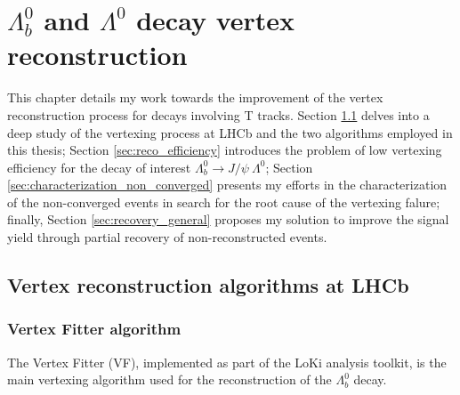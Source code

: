 \chapter{\texorpdfstring{$\Lambda_b^0$}{Lambdab} and \texorpdfstring{$\Lambda^0$}{Lambda} decay vertex reconstruction}
\label{cap:vertex_reconstruction}
This chapter details my work towards the improvement of the vertex reconstruction process for decays involving T tracks.
Section \ref{sec:reco_algorithms} delves into a deep study of the vertexing process at LHCb and the two algorithms employed in this thesis;
Section \ref{sec:reco_efficiency} introduces the problem of low vertexing efficiency for the decay of interest $\Lambda_b^0 \rightarrow J/\psi~\Lambda^0$;
Section \ref{sec:characterization_non_converged} presents my efforts in the characterization of the non-converged events in search for the root cause of the vertexing falure;
finally, Section \ref{sec:recovery_general} proposes my solution to improve the signal yield through partial recovery of non-reconstructed events.

\section{Vertex reconstruction algorithms at LHCb}
\label{sec:reco_algorithms}

\subsection{Vertex Fitter algorithm}
The Vertex Fitter (VF), implemented as part of the LoKi analysis toolkit, is the main vertexing algorithm used for the reconstruction of the $\Lambda_b^0$ decay.

